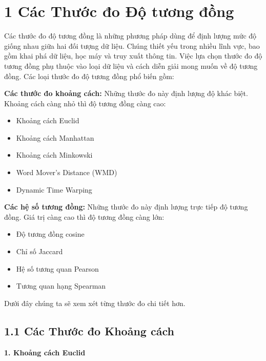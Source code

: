 \section{1 Các Thước đo Độ tương đồng}

Các thước đo độ tương đồng là những phương pháp dùng để định lượng mức độ giống nhau giữa hai đối tượng dữ liệu. Chúng thiết yếu trong nhiều lĩnh vực, bao gồm khai phá dữ liệu, học máy và truy xuất thông tin. Việc lựa chọn thước đo độ tương đồng phụ thuộc vào loại dữ liệu và cách diễn giải mong muốn về độ tương đồng. Các loại thước đo độ tương đồng phổ biến gồm:

\textbf{Các thước đo khoảng cách:} Những thước đo này định lượng độ khác biệt. Khoảng cách càng nhỏ thì độ tương đồng càng cao:

\begin{itemize}
  \item Khoảng cách Euclid
  \item Khoảng cách Manhattan
  \item Khoảng cách Minkowski
  \item Word Mover's Distance (WMD)
  \item Dynamic Time Warping
\end{itemize}

\textbf{Các hệ số tương đồng:} Những thước đo này định lượng trực tiếp độ tương đồng. Giá trị càng cao thì độ tương đồng càng lớn:

\begin{itemize}
  \item Độ tương đồng cosine
  \item Chỉ số Jaccard
  \item Hệ số tương quan Pearson
  \item Tương quan hạng Spearman
\end{itemize}

Dưới đây chúng ta sẽ xem xét từng thước đo chi tiết hơn.

\subsection{1.1 Các Thước đo Khoảng cách}

\textbf{1. Khoảng cách Euclid}

